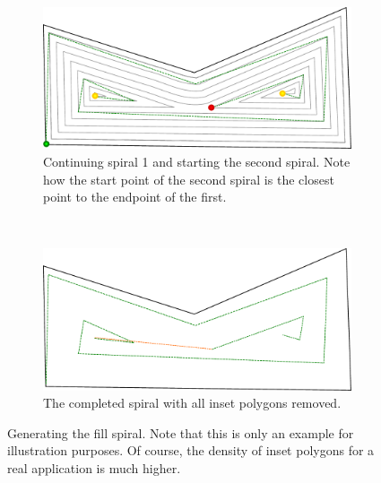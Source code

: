 \begin{figure}[htbp]
\begin{subfigure}[b]{0.45\textwidth}
    \end{subfigure}
        \begin{subfigure}[b]{0.45\textwidth}
    		\includegraphics[width=\textwidth]{images/algorithms/spiral_fill/after_done_2.pdf}
    		\caption{Continuing spiral 1 and starting the second spiral. Note how the start point of the second spiral is the closest point to the endpoint of the first.} \label{splitevent}
    \end{subfigure}
\\
        \begin{subfigure}[b]{0.45\textwidth}
    		\includegraphics[width=\textwidth]{images/algorithms/spiral_fill/complete_done.pdf}
    		\caption{The completed spiral with all inset polygons removed.}
    \end{subfigure}
	\caption{Generating the fill spiral. Note that this is only an example for illustration purposes. Of course, the density of inset polygons for a real application is much higher.} \label{fig:insetting}
\end{figure}


